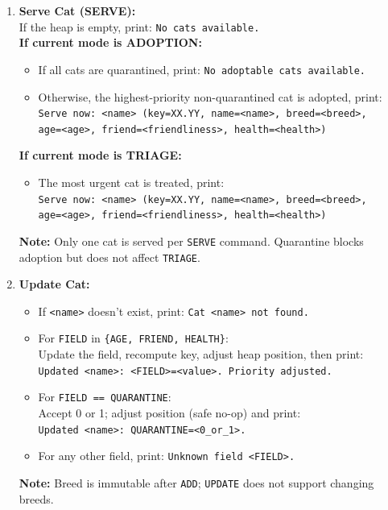 \documentclass[11pt]{article}
\begin{document}
\begin{enumerate}
    \item \textbf{Serve Cat (SERVE):} \\
    If the heap is empty, print: \texttt{No cats available.} \\
    \textbf{If current mode is ADOPTION:}
    \begin{itemize}
        \item If all cats are quarantined, print: \texttt{No adoptable cats available.}
        \item Otherwise, the highest-priority non-quarantined cat is adopted, print: \\
        \texttt{Serve now: <name> (key=XX.YY, name=<name>, breed=<breed>,} \\ \texttt{age=<age>, friend=<friendliness>, health=<health>)}
    \end{itemize}
    \textbf{If current mode is TRIAGE:}
    \begin{itemize}
        \item The most urgent cat is treated, print: \\
        \texttt{Serve now: <name> (key=XX.YY, name=<name>, breed=<breed>,} \\ \texttt{age=<age>, friend=<friendliness>, health=<health>)}
    \end{itemize}
    \textbf{Note:} Only one cat is served per \texttt{SERVE} command. Quarantine blocks adoption but does not affect \texttt{TRIAGE}.

    \item \textbf{Update Cat:}
    \begin{itemize}
        \item If \texttt{<name>} doesn't exist, print: \texttt{Cat <name> not found.}
        \item For \texttt{FIELD} in \texttt{\{AGE, FRIEND, HEALTH\}}: \\
        Update the field, recompute key, adjust heap position, then print: \\
        \texttt{Updated <name>: <FIELD>=<value>. Priority adjusted.}
        \item For \texttt{FIELD == QUARANTINE}: \\
        Accept 0 or 1; adjust position (safe no-op) and print: \\
        \texttt{Updated <name>: QUARANTINE=<0\_or\_1>.}
        \item For any other field, print: \texttt{Unknown field <FIELD>.}
    \end{itemize}
    \textbf{Note:} Breed is immutable after \texttt{ADD}; \texttt{UPDATE} does not support changing breeds.


\end{enumerate}
\end{document}
